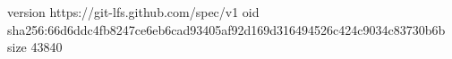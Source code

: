 version https://git-lfs.github.com/spec/v1
oid sha256:66d6ddc4fb8247ce6eb6cad93405af92d169d316494526c424c9034c83730b6b
size 43840
